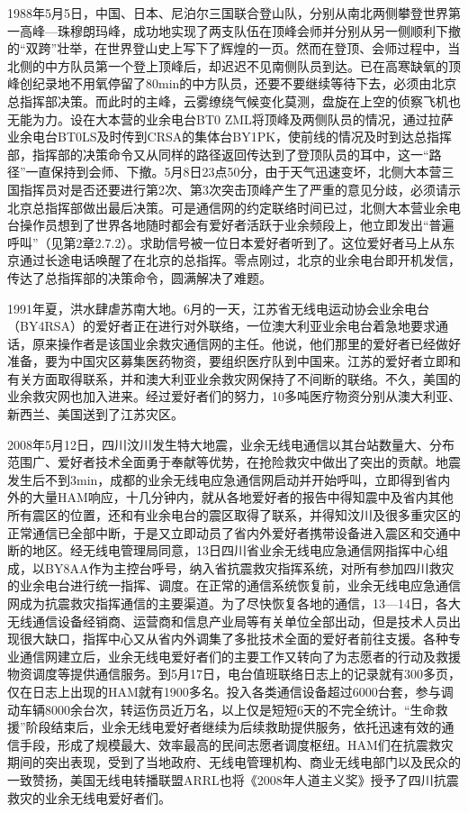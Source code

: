 \documentclass[12pt,UTF8]{ctexbook}
\begin{document}
1988年5月5日，中国、日本、尼泊尔三国联合登山队，分别从南北两侧攀登世界第一高峰—珠穆朗玛峰，成功地实现了两支队伍在顶峰会师并分别从另一侧顺利下撤的“双跨”壮举，在世界登山史上写下了辉煌的一页。然而在登顶、会师过程中，当北侧的中方队员第一个登上顶峰后，却迟迟不见南侧队员到达。已在高寒缺氧的顶峰创纪录地不用氧停留了80min的中方队员，还要不要继续等待下去，必须由北京总指挥部决策。而此时的主峰，云雾缭绕气候变化莫测，盘旋在上空的侦察飞机也无能为力。设在大本营的业余电台BT0 ZML将顶峰及两侧队员的情况，通过拉萨业余电台BT0LS及时传到CRSA的集体台BY1PK，使前线的情况及时到达总指挥部，指挥部的决策命令又从同样的路径返回传达到了登顶队员的耳中，这一“路径”一直保持到会师、下撤。5月8日23点50分，由于天气迅速变坏，北侧大本营三国指挥员对是否还要进行第2次、第3次突击顶峰产生了严重的意见分歧，必须请示北京总指挥部做出最后决策。可是通信网的约定联络时间已过，北侧大本营业余电台操作员想到了世界各地随时都会有爱好者活跃于业余频段上，他立即发出“普遍呼叫”（见第2章2.7.2）。求助信号被一位日本爱好者听到了。这位爱好者马上从东京通过长途电话唤醒了在北京的总指挥。零点刚过，北京的业余电台即开机发信，传达了总指挥部的决策命令，圆满解决了难题。

1991年夏，洪水肆虐苏南大地。6月的一天，江苏省无线电运动协会业余电台（BY4RSA）的爱好者正在进行对外联络，一位澳大利亚业余电台着急地要求通话，原来操作者是该国业余救灾通信网的主任。他说，他们那里的爱好者已经做好准备，要为中国灾区募集医药物资，要组织医疗队到中国来。江苏的爱好者立即和有关方面取得联系，并和澳大利亚业余救灾网保持了不间断的联络。不久，美国的业余救灾网也加入进来。经过爱好者们的努力，10多吨医疗物资分别从澳大利亚、新西兰、美国送到了江苏灾区。

2008年5月12日，四川汶川发生特大地震，业余无线电通信以其台站数量大、分布范围广、爱好者技术全面勇于奉献等优势，在抢险救灾中做出了突出的贡献。地震发生后不到3min，成都的业余无线电应急通信网启动并开始呼叫，立即得到省内外的大量HAM响应，十几分钟内，就从各地爱好者的报告中得知震中及省内其他所有震区的位置，还和有业余电台的震区取得了联系，并得知汶川及很多重灾区的正常通信已全部中断，于是又立即动员了省内外爱好者携带设备进入震区和交通中断的地区。经无线电管理局同意，13日四川省业余无线电应急通信网指挥中心组成，以BY8AA作为主控台呼号，纳入省抗震救灾指挥系统，对所有参加四川救灾的业余电台进行统一指挥、调度。在正常的通信系统恢复前，业余无线电应急通信网成为抗震救灾指挥通信的主要渠道。为了尽快恢复各地的通信，13—14日，各大无线通信设备经销商、运营商和信息产业局等有关单位全部出动，但是技术人员出现很大缺口，指挥中心又从省内外调集了多批技术全面的爱好者前往支援。各种专业通信网建立后，业余无线电爱好者们的主要工作又转向了为志愿者的行动及救援物资调度等提供通信服务。到5月17日，电台值班联络日志上的记录就有300多页，仅在日志上出现的HAM就有1900多名。投入各类通信设备超过6000台套，参与调动车辆8000余台次，转运伤员近万名，以上仅是短短6天的不完全统计。“生命救援”阶段结束后，业余无线电爱好者继续为后续救助提供服务，依托迅速有效的通信手段，形成了规模最大、效率最高的民间志愿者调度枢纽。HAM们在抗震救灾期间的突出表现，受到了当地政府、无线电管理机构、商业无线电部门以及民众的一致赞扬，美国无线电转播联盟ARRL也将《2008年人道主义奖》授予了四川抗震救灾的业余无线电爱好者们。
\end{document}
